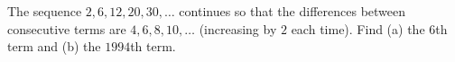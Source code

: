 The sequence $2,6,12,20,30,\dots$ continues so that the differences between consecutive terms are $4,6,8,10,\dots$ (increasing by $2$ each time). Find (a) the $6$th term and (b) the $1994$th term.
